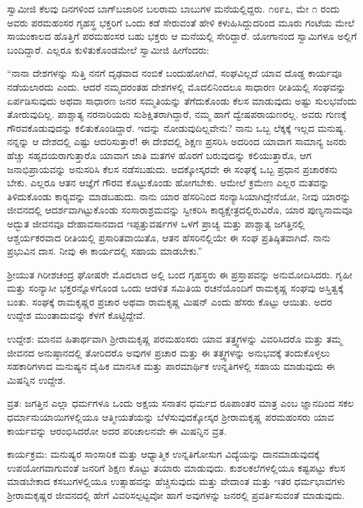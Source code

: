  ಸ್ವಾಮೀಜಿ ಕೆಲವು ದಿನಗಳಿಂದ ಬಾಗ್‍ಬಜಾರಿನ ಬಲರಾಮ ಬಾಬುಗಳ ಮನೆಯಲ್ಲಿದ್ದರು. ೧೮೯೭, ಮೇ ೧ ರಂದು ಅವರು ಪರಮಹಂಸರ ಗೃಹಸ್ಥ ಭಕ್ತರಿಗೆ ಒಂದು ಕಡೆ ಸೇರುವಂತೆ ಹೇಳಿ ಕಳುಹಿಸಿದ್ದುದರಿಂದ ಮೂರು ಗಂಟೆಯ ಮೇಲೆ ಸಾಯಂಕಾಲದ ಹೊತ್ತಿಗೆ ಪರಮಹಂಸರ ಬಹು ಭಕ್ತರು ಆ ಮನೆಯಲ್ಲಿ ಸೇರಿದ್ದಾರೆ. ಯೋಗಾನಂದ ಸ್ವಾಮಿಗಳೂ ಅಲ್ಲಿಗೆ ಬಂದಿದ್ದಾರೆ. ಎಲ್ಲರೂ ಕುಳಿತುಕೊಂಡಮೇಲೆ ಸ್ವಾಮೀಜಿ ಹೀಗೆಂದರು: 

 “ನಾನಾ ದೇಶಗಳನ್ನು ಸುತ್ತಿ ನನಗೆ ದೃಢವಾದ ನಂಬಿಕೆ ಬಂದುಹೋಗಿದೆ, ಸಂಘವಿಲ್ಲದೆ ಯಾವ ದೊಡ್ಡ ಕಾರ್ಯವೂ ನಡೆಯಲಾರದು ಎಂದು. ಆದರೆ ನಮ್ಮದರಂತಹ ದೇಶಗಳಲ್ಲಿ ಮೊದಲಿನಿಂದಲೂ ಸಾಧಾರಣ ರೀತಿಯಲ್ಲಿ ಸಂಘವನ್ನು ಏರ್ಪಡಿಸುವುದು ಅಥವಾ ಸಾಧಾರಣ ಜನರ ಸಮ್ಮತಿಯನ್ನು ತೆಗೆದುಕೊಂಡು ಕೆಲಸ ಮಾಡುವುದು ಅಷ್ಟು ಸುಲಭವೆಂದು ತೋರುವುದಿಲ್ಲ. ಪಾಶ್ಚಾತ್ಯ ನರನಾರಿಯರು ಸುಶಿಕ್ಷಿತರಾಗಿದ್ದಾರೆ, ನಮ್ಮ ಹಾಗೆ ದ್ವೇಷಪರಾಯಣರಲ್ಲ. ಅವರು ಗುಣಕ್ಕೆ ಗೌರವಕೊಡುವುದನ್ನು ಕಲಿತುಕೊಂಡಿದ್ದಾರೆ. ಇದನ್ನು ನೋಡುವುದಿಲ್ಲವೇನು? ನಾನು ಒಬ್ಬ ಲೆಕ್ಕಕ್ಕೆ ಇಲ್ಲದ ಮನುಷ್ಯ. ನನ್ನನ್ನು ಆ ದೇಶದಲ್ಲಿ ಎಷ್ಟು ಆದರಿಸುತ್ತಾರೆ! ಈ ದೇಶದಲ್ಲಿ ಶಿಕ್ಷಣ ಪ್ರಸರಿಸಿ ಅದರಿಂದ ಯಾವಾಗ ಸಾಮಾನ್ಯ ಜನರು ಹೆಚ್ಚು ಸಹೃದಯರಾಗುತ್ತಾರೊ ಯಾವಾಗ ಜಾತಿ ಮತಗಳ ಹೊರಗೆ ಬರುವುದನ್ನು ಕಲಿಯುತ್ತಾರೊ, ಆಗ ಜನಾಭಿಪ್ರಾಯವನ್ನು ಅನುಸರಿಸಿ ಕೆಲಸ ನಡೆಸಬಹುದು. ಅದಕ್ಕೋಸ್ಕರವೇ ಈ ಸಂಘಕ್ಕೆ ಒಬ್ಬ ಪ್ರಧಾನ ಪ್ರಚಾರಕನು ಬೇಕು. ಎಲ್ಲರೂ ಆತನ ಆಜ್ಞೆಗೆ ಗೌರವ ಕೊಟ್ಟುಕೊಂಡು ಹೋಗಬೇಕು. ಆಮೇಲೆ ಕ್ರಮೇಣ ಎಲ್ಲರ ಮತವನ್ನು ತಿಳಿದುಕೊಂಡು ಕಾರ‍್ಯವನ್ನು ಮಾಡಬಹುದು. ನಾನು ಯಾರ ಹೆಸರಿನಿಂದ ಸಂನ್ಯಾಸಿಯಾಗಿದ್ದೇನೆಯೋ, ನೀವು ಯಾರನ್ನು ಜೀವನದಲ್ಲಿ ಆದರ್ಶವಾಗಿಟ್ಟುಕೊಂಡು ಸಂಸಾರಾಶ್ರಮವನ್ನು ಸ್ವೀಕರಿಸಿ ಕಾರ‍್ಯಕ್ಷೇತ್ರದಲ್ಲಿರುವಿರೊ, ಯಾರ ಪುಣ್ಯನಾಮವೂ ಅದ್ಭುತ ಜೀವನವೂ‌ ದೇಹಾವಸಾನವಾದ ಇಪ್ಪತ್ತು\break ವರ್ಷಗಳ ಒಳಗೆ ಪ್ರಾಚ್ಯ ಮತ್ತು ಪಾಶ್ಚಾತ್ಯ ಜಗತ್ತಿನಲ್ಲಿ ಆಶ್ಚರ್ಯಕರವಾದ ರೀತಿಯಲ್ಲಿ ಪ್ರಸಾರಿತವಾಯಿತೊ, ಆತನ ಹೆಸರಿನಲ್ಲಿಯೇ ಈ ಸಂಘ ಪ್ರತಿಷ್ಠಿತವಾಗಿದೆ. ನಾನು ಪ್ರಭುವಿನ ದಾಸ. ನೀವು ಈ ಕಾರ್ಯದಲ್ಲಿ ಸಹಾಯ ಮಾಡಬೇಕು.” 

 ಶ‍್ರೀಯುತ ಗಿರೀಶಚಂದ್ರ ಘೋಷರೇ ಮೊದಲಾದ ಅಲ್ಲಿ ಬಂದ ಗೃಹಸ್ಥರು ಈ ಪ್ರಸ್ತಾಪವನ್ನು ಅನುಮೋದಿಸಿದರು. ಗೃಹೀ ಮತ್ತು ಸಂನ್ಯಾಸೀ ಭಕ್ತರನ್ನೊಳಗೊಂಡ ಒಂದು ಆಡಳಿತ ಸಮಿತಿಯ ರಚನೆಯೊಂದಿಗೆ ರಾಮಕೃಷ್ಣ ಸಂಘವು ಅಸ್ತಿತ್ವಕ್ಕೆ ಬಂತು. ಸಂಘಕ್ಕೆ ರಾಮಕೃಷ್ಣರ ಪ್ರಚಾರ ಅಥವಾ ರಾಮಕೃಷ್ಣ ಮಿಷನ್ ಎಂದು ಹೆಸರು ಕೊಟ್ಟು ಆಯಿತು. ಅದರ ಉದ್ದೇಶ ಮುಂತಾದುವನ್ನು ಕೆಳಗೆ ಕೊಟ್ಟಿದ್ದೇವೆ. 

 ಉದ್ದೇಶ: ಮಾನವ ಹಿತಾರ್ಥವಾಗಿ ಶ‍್ರೀರಾಮಕೃಷ್ಣ ಪರಮಹಂಸರು ಯಾವ ತತ್ತ್ವಗಳನ್ನು ವಿವರಿಸಿದರೊ ಮತ್ತು ತಮ್ಮ ಜೀವನದ ಅನುಷ್ಠಾನದಲ್ಲಿ ತೋರಿದರೊ ಅವುಗಳ ಪ್ರಚಾರ ಮತ್ತು ಈ ತತ್ತ್ವಗಳನ್ನು ಅನುಭವಕ್ಕೆ ತಂದುಕೊಳ್ಳಲು ಸಹಕಾರಿಗಳಾದ ಮನುಷ್ಯನ ದೈಹಿಕ ಮಾನಸಿಕ ಮತ್ತು ಪಾರಮಾರ್ಥಿಕ ಉನ್ನತಿಗಳಲ್ಲಿ ಸಹಾಯ ಮಾಡುವುದು ಈ ಮಿಷನ್ನಿನ ಉದ್ದೇಶ. 

 ವ್ರತ: ಜಗತ್ತಿನ ಎಲ್ಲಾ ಧರ್ಮಗಳೂ ಒಂದು ಅಕ್ಷಯ ಸನಾತನ ಧರ್ಮದ ರೂಪಾಂತರ ಮಾತ್ರ ಎಂಬ ಜ್ಞಾನದಿಂದ ಸಕಲ ಧರ್ಮಾನುಯಾಯಿಗಳಲ್ಲಿಯೂ ಆತ್ಮೀಯತೆಯನ್ನು ಬೆಳೆಸುವುದಕ್ಕೋಸ್ಕರ ಶ‍್ರೀರಾಮಕೃಷ್ಣ ಪರಮಹಂಸರು ಯಾವ ಕಾರ್ಯವನ್ನು ಆರಂಭಿಸಿದರೋ ಅದರ ಪರಿಚಾಲನವೇ ಈ ಮಿಷನ್ನಿನ ವ್ರತ. 

 ಕಾರ್ಯಕ್ರಮ: ಮನುಷ್ಯರ ಸಾಂಸಾರಿಕ ಮತ್ತು ಆಧ್ಯಾತ್ಮಿಕ ಉನ್ನತಿಗೋಸುಗ ವಿದ್ಯೆಯನ್ನು ದಾನಮಾಡುವುದಕ್ಕೆ ಉಪಯೋಗವಾಗುವಂತೆ ಜನರಿಗೆ ಶಿಕ್ಷಣ ಕೊಟ್ಟು ತಯಾರು ಮಾಡುವುದು. ಕುಶಲಕಲೆಗಳಲ್ಲಿಯೂ ಕಷ್ಟಪಟ್ಟು ಕೆಲಸ ಮಾಡಬೇಕಾದ ಕಸಬುಗಳಲ್ಲಿಯೂ ಉತ್ಸಾಹವನ್ನು ಹೆಚ್ಚಿಸುವುದು ಮತ್ತು ವೇದಾಂತ ಮತ್ತು ಇತರ ಧರ್ಮಭಾವಗಳು ಶ‍್ರೀರಾಮಕೃಷ್ಣರ ಜೀವನದಲ್ಲಿ ಹೇಗೆ ವಿವರಿಸಲ್ಪಟ್ಟವೋ‌ ಹಾಗೆ ಅವುಗಳನ್ನು ಜನರಲ್ಲಿ ಪ್ರವರ್ತಿಸುವಂತೆ ಮಾಡುವುದು. 

